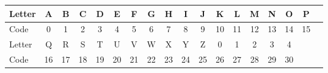 \documentclass[12pt,emtex]{article}
\begin{document}
\begin{enumerate}
          \hspace{-10mm}   
                \begin{tabular}{|l||c|c|c|c|c|c|c|c|c|c|c|c|c|c|c|c|c|} \hline
                  Letter  & \hspace{0.5mm}  A   \hspace{0.5mm} & \hspace{0.5mm} B \hspace{0.5mm} & \hspace{0.5mm} C \hspace{0.5mm}
                          & \hspace{0.5mm}  D   \hspace{0.5mm} & \hspace{0.5mm} E \hspace{0.5mm} & \hspace{0.5mm} F \hspace{0.5mm}
                          & \hspace{0.5mm}  G   \hspace{0.5mm} & \hspace{0.5mm} H \hspace{0.5mm} & \hspace{0.5mm} I \hspace{0.5mm}
                          & \hspace{0.5mm}  J   \hspace{0.5mm} & \hspace{0.5mm} K \hspace{0.5mm} & \hspace{0.5mm} L \hspace{0.5mm}
                          & \hspace{0.5mm}  M   \hspace{0.5mm} &  \hspace{0.5mm} N  \hspace{0.5mm}   &  \hspace{0.5mm}   O  \hspace{0.5mm} &  \hspace{0.5mm} P  \hspace{0.5mm} \\ \hline
                  Code  & 0   &   1   &   2   &   3   &   4   &   5   &   6   &   7   &   8   &   9   &   10  &   11  &   12 & 13  &   14 & 15  \\ \hline \hline
                  Letter     &   Q   &   R   &   S   &   T   &   U   &   V   &   W   &   X   &   Y   &   Z & 0 & 1& 2& 3 & 4 &  \\ \hline
                  Code    &   16  &   17  &   18  &   19  &   20  &   21  &   22  &   23  &   24  &   25 & 26 & 27 & 28 & 29 & 30 & \\ \hline
                \end{tabular}
    

\end{enumerate}
\end{document}
